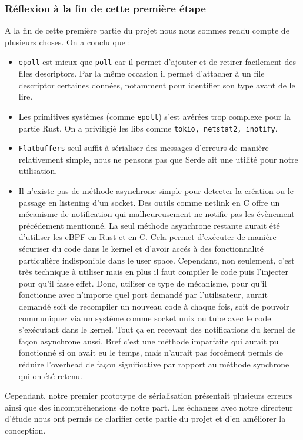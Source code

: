 \documentclass{article}
\begin{document}
\subsubsection{Réflexion à la fin de cette première étape}

A la fin de cette première partie du projet nous nous sommes rendu compte de plusieurs choses. On a conclu que : 
\begin{itemize}
    \item \texttt{epoll} est mieux que \texttt{poll} car il permet d'ajouter et de retirer facilement des files descriptors. Par la même occasion il permet d’attacher à un file descriptor certaines données, notamment pour identifier son type avant de le lire.
    \item Les primitives systèmes (comme \texttt{epoll}) s'est avérées trop complexe pour la partie Rust. On a priviligié les libs comme \texttt{tokio, netstat2, inotify}.
    \item \texttt{Flatbuffers} seul suffit à sérialiser des messages d’erreurs de manière relativement simple, nous ne pensons pas que Serde ait une utilité pour notre utilisation.
    \item Il n'existe pas de méthode asynchrone simple pour detecter la création ou le passage en listening d'un socket. Des outils comme netlink en C offre un mécanisme de notification qui malheureusement ne notifie pas les évènement précédement mentionné. La seul méthode asynchrone restante aurait été d'utiliser les eBPF en Rust et en C. Cela permet d'exécuter de manière sécuriser du code dans le kernel et d'avoir accés à des fonctionnalité particulière indisponible dans le user space. Cependant, non seulement, c'est très technique à utiliser mais en plus il faut compiler le code puis l'injecter pour qu'il fasse effet. Donc, utiliser ce type de mécanisme, pour qu'il fonctionne avec n'importe quel port demandé par l'utilisateur, aurait demandé soit de recompiler un nouveau code à chaque fois, soit de pouvoir communiquer via un système comme socket unix ou tube avec le code s'exécutant dans le kernel. Tout ça en recevant des notifications du kernel de façon asynchrone aussi. Bref c'est une méthode imparfaite qui aurait pu fonctionné si on avait eu le temps, mais n'aurait pas forcément permis de réduire l'overhead de façon significative par rapport au méthode synchrone qui on été retenu.
\end{itemize}

Cependant, notre premier prototype de sérialisation présentait plusieurs erreurs ainsi que des incompréhensions de notre part. Les échanges avec notre directeur d’étude nous ont permis de clarifier cette partie du projet et d’en améliorer la conception.
\end{document}
